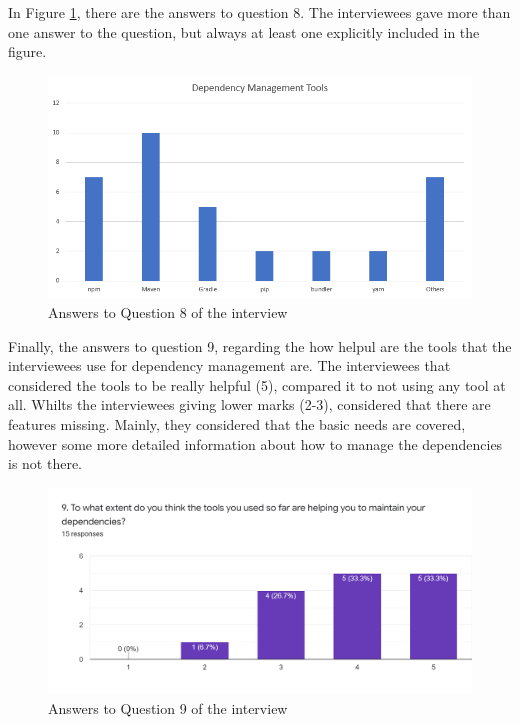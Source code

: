 In Figure \ref{fig:interview-8}, there are the answers to question 8. The interviewees gave more than one answer to the question, but always at least one explicitly included in the figure.

\begin{figure}[ht]
\begin{center}
\includegraphics[width=\textwidth]{figures/interview/Question8.png}
\caption{Answers to Question 8 of the interview}
\label{fig:interview-8}
\end{center}
\end{figure}

Finally, the answers to question 9, regarding the how helpul are the tools that the interviewees use for dependency management are. The interviewees that considered the tools to be really helpful (5), compared it to not using any tool at all. Whilts the interviewees giving lower marks (2-3), considered that there are features missing. Mainly, they considered that the basic needs are covered, however some more detailed information about how to manage the dependencies is not there.

\begin{figure}[ht]
\begin{center}
\includegraphics[width=\textwidth]{figures/interview/Question9.png}
\caption{Answers to Question 9 of the interview}
\label{fig:interview-9}
\end{center}
\end{figure}

